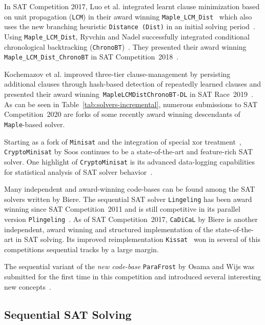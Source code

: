 \documentclass{elsarticle}
\newcommand{\solver}[1]{\texttt{#1}}
\begin{document}
In SAT Competition 2017, Luo et al. integrated learnt clause minimization based on unit propagation (\solver{LCM}) in their award winning \solver{Maple\_LCM\_Dist}~\cite{Luo:2017:LCM} which also uses the new branching heuristic \solver{Distance (Dist)} in an initial solving period~\cite{Xiao:2017:MapleLCMDist}. 
Using \solver{Maple\_LCM\_Dist}, Ryvchin and Nadel successfully integrated conditional chronological backtracking (\solver{ChronoBT})~\cite{Nadel:2018:CBT}. 
They presented their award winning \solver{Maple\_LCM\_Dist\_ChronoBT} in SAT Competition~2018~\cite{Ryvchin:SC2018:MapleChronoBT}. 

Kochemazov et al. improved three-tier clause-management by persisting
additional clauses through hash-based detection of repeatedly learned clauses and presented their award winning~\solver{MapleLCMDistChronoBT-DL} in SAT Race~2019~\cite{Kochemazov:SC2019:MapleChronoBTDL}. 
As can be seen in Table~\ref{tab:solvers-incremental}, numerous submissions to SAT Competition~2020 are forks of some recently award winning descendants of \solver{Maple}-based solver. 

Starting as a fork of \solver{Minisat} and the integration of special xor treatment~\cite{Soos:2009:Crypto}, \solver{CryptoMinisat} by Soos continues to be a state-of-the-art and feature-rich SAT solver. 
One highlight of \solver{CryptoMinisat} is its advanced data-logging capabilities for statistical analysis of SAT solver behavior~\cite{Soos:2019:ChrystalBall}.

Many independent and award-winning code-bases can be found among the SAT solvers written by Biere. 
The sequential SAT solver \solver{Lingeling} has been award winning since SAT Competition~2011 and is still competitive in its parallel version \solver{Plingeling}~\cite{Biere:2012:Lingeling}. 
As of SAT Competition~2017, \solver{CaDiCaL} %
by Biere is another independent, award winning and structured implementation of the state-of-the-art in SAT solving. 
Its improved reimplementation \solver{Kissat}~\cite{Biere:SC2020} won in several of this competitions sequential tracks by a large margin. 

The sequential variant of the \emph{new code-base} \solver{ParaFrost} by Osama and Wijs was submitted for the first time in this competition and introduced several interesting new concepts~\cite{Osama:SC2020:Parafrost}. 


\subsection{Sequential SAT Solving}
\label{sec:part:seq}
\end{document}
